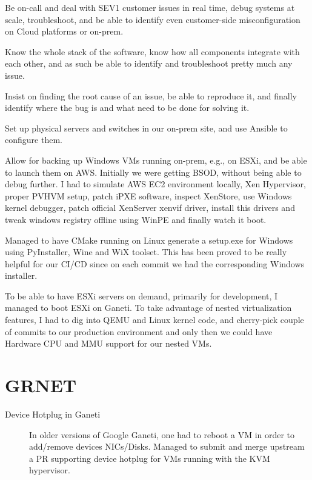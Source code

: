 \documentclass[margin,centered]{res}
\begin{document}
\begin{resume}
\begin{description}
Be on-call and deal with SEV1 customer issues in real time, debug systems at
scale, troubleshoot, and be able to identify even customer-side
misconfiguration on Cloud platforms or on-prem.
\item[Full stack awareness]
Know the whole stack of the software, know how all components integrate with
each other, and as such be able to identify and troubleshoot pretty much any
issue.
\item[Bug hunting]
Insist on finding the root cause of an issue, be able to reproduce it, and
finally identify where the bug is and what need to be done for solving it.
\item[Infra]
Set up physical servers and switches in our on-prem site, and use Ansible
to configure them.
\item[BSOD on AWS]
Allow for backing up Windows VMs running on-prem, e.g., on ESXi, and be
able to launch them on AWS. Initially we were getting BSOD, without being
able to debug further. I had to simulate AWS EC2 environment
locally, Xen Hypervisor, proper PVHVM setup, patch iPXE software, inspect
XenStore, use Windows kernel debugger, patch official XenServer xenvif driver,
install this drivers and tweak windows registry offline using WinPE and
finally watch it boot.
\item[Packaging for Windows]
Managed to have CMake running on Linux generate a setup.exe for Windows using
PyInstaller, Wine and WiX toolset. This has been proved to be really helpful for
our CI/CD since on each commit we had the corresponding Windows installer.
\item[Nested ESXi]
To be able to have ESXi servers on demand, primarily for development, I managed
to boot ESXi on Ganeti. To take advantage of nested
virtualization features, I had to dig into QEMU and Linux kernel code, and
cherry-pick couple of commits to our production environment and only then we
could have Hardware CPU and MMU support for our nested VMs.
\end{description}


\pagebreak
\section{\sc GRNET}

\begin{description}
\item[Device Hotplug in Ganeti]
In older versions of Google Ganeti, one had to reboot a VM in order to
add/remove devices NICs/Disks. Managed to submit and merge upstream a PR
supporting device hotplug for VMs running with the KVM hypervisor.


\end{description}
\end{resume}
\end{document}
